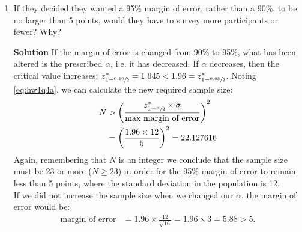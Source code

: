 \begin{enumerate}
\begin{enumerate}
        \item If they decided they wanted a 95\% margin of error, rather than a 90\%, to be no larger than 5 points, would they have to survey more participants or fewer? Why?
        \begin{framed}{\textbf{Solution}}
        If the margin of error is changed from 90\% to 95\%, what has been altered is the prescribed $\alpha$, i.e. it has decreased. If $\alpha$ decreases, then the critical value increases: $z^*_{1 - \sfrac{0.10}{2}} = 1.645 < 1.96 = z^*_{1 - \sfrac{0.05}{2}}$. Noting \eqref{eq:hw1q4a}, we can calculate the new required sample size: 
        \begin{align}
            N &> \left( \frac{z^*_{1 - \sfrac{\alpha}{2}} \times \sigma}{\text{max margin of error}}\right)^2 \\
            &= \left( \frac{1.96 \times 12}{5}\right)^2 = 22.127616
        \end{align}
        Again, remembering that $N$ is an integer we conclude that the sample size must be 23 or more ($N\geq 23$) in order for the 95\% margin of error to remain less than 5 points, where the standard deviation in the population is 12.\\
        If we did not increase the sample size when we changed our $\alpha$, the margin of error would be:
        \begin{align}
            \text{margin of error} &= 1.96 \times \frac{12}{\sqrt{16}} = 1.96 \times 3 = 5.88 >5.
        \end{align}
        \end{framed}
    \end{enumerate}
\end{enumerate}

